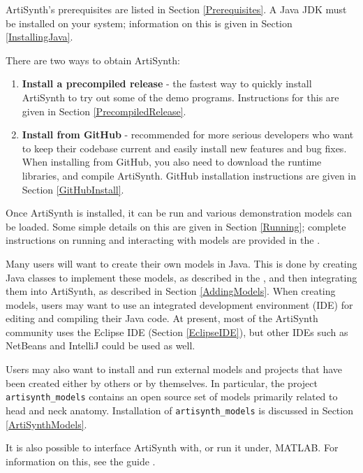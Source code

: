 ArtiSynth's prerequisites are listed in Section \ref{Prerequisites}. A
Java JDK must be installed on your system; information on this is
given in Section \ref{InstallingJava}.

There are two ways to obtain ArtiSynth:

\begin{enumerate}

\item {\bf Install a precompiled release} - the
fastest way to quickly install ArtiSynth to try out some of the demo
programs. Instructions for this are given in Section 
\ref{PrecompiledRelease}.

\item {\bf Install from GitHub} - recommended
for more serious developers who want to keep their codebase current
and easily install new features and bug fixes. When installing from
GitHub, you also need to download the runtime libraries, and compile
ArtiSynth. GitHub installation instructions are given in Section
\ref{GitHubInstall}.

\end{enumerate}

Once ArtiSynth is installed, it can be run and various demonstration
models can be loaded. Some simple details on this are given in
Section \ref{Running}; complete instructions on running and
interacting with models are provided in
the .

Many users will want to create their own models in Java. This is done
by creating Java classes to implement these models, as described in
the , and then
integrating them into ArtiSynth, as described in
Section \ref{AddingModels}.  When creating models, users may want to
use an integrated development environment (IDE) for editing and
compiling their Java code.  At present, most of the ArtiSynth
community uses the Eclipse IDE (Section \ref{EclipseIDE}), but other
IDEs such as NetBeans and IntelliJ could be used as well.

Users may also want to install and run external models and projects
that have been created either by others or by themselves.  In
particular, the project {\tt artisynth\_models} contains an
open source set of models primarily related to head and neck
anatomy. Installation of {\tt artisynth\_models} is discussed in
Section \ref{ArtiSynthModels}.

It is also possible to interface ArtiSynth with, or run it under,
MATLAB. For information on this, see the guide
.

